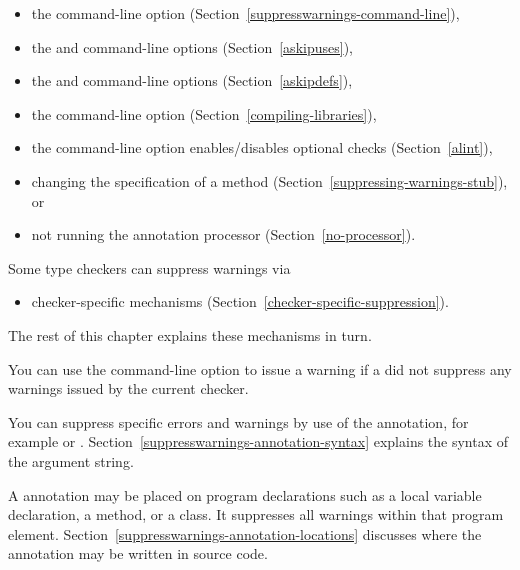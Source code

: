 \begin{itemize}
\item
  the  command-line option (Section~\ref{suppresswarnings-command-line}),
\item
  the  and  command-line options (Section~\ref{askipuses}),
\item
  the  and  command-line options (Section~\ref{askipdefs}),
\item
  the  command-line
  option (Section~\ref{compiling-libraries}),
\item
  the  command-line option enables/disables optional checks (Section~\ref{alint}),
\item
  changing the specification of a method (Section~\ref{suppressing-warnings-stub}), or
\item
  not running the annotation processor
  (Section~\ref{no-processor}).
\end{itemize}

Some type checkers can suppress warnings via
\begin{itemize}
\item
  checker-specific mechanisms (Section~\ref{checker-specific-suppression}).
\end{itemize}

\noindent
The rest of this chapter explains these mechanisms in turn.

You can use the  command-line option to issue a
warning if a  did not suppress any warnings issued by the current checker.



\begin{sloppypar}
You can suppress specific errors and warnings by use of the
 annotation, for example
 or .
Section~\ref{suppresswarnings-annotation-syntax} explains the syntax of the
argument string.
\end{sloppypar}

A 
annotation may be placed on program declarations such as a local
variable declaration, a method, or a class.  It suppresses all warnings
within that program element.
Section~\ref{suppresswarnings-annotation-locations} discusses where the
annotation may be written in source code.

